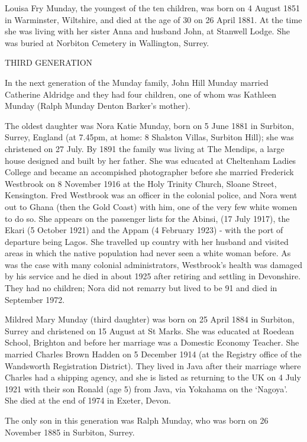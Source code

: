Louisa Fry Munday, the youngest of the ten children, was born on 4 August 1851 in Warminster, Wiltshire, and died at the age of 30 on 26 April 1881. At the time she was living with her sister Anna and husband John, at Stanwell Lodge. She was buried at Norbiton Cemetery in	Wallington, Surrey. 


THIRD GENERATION

In the next generation of the Munday family, John Hill Munday married Catherine Aldridge and they had four children, one of whom was Kathleen Munday (Ralph Munday Denton Barker's mother). 

The oldest daughter was Nora Katie Munday, born on 5 June 1881 in Surbiton, Surrey, England (at 7.45pm, at home: 8 Shalston Villas, Surbiton Hill); she was christened on 27 July. By 1891 the family was living at The Mendips, a large house designed and built by her father. She was educated at Cheltenham Ladies College and became an accompished photographer before she married Frederick Westbrook on 8 November 1916 at the	Holy Trinity Church, Sloane Street, Kensington. Fred Westbrook  was an officer in the colonial police, and Nora went out to Ghana (then the Gold Coast) with him, one of the very few white women to do so. She appears on the passenger lists for the Abinsi, (17 July 1917), the Ekari (5 October 1921) and the Appam (4 February 1923) - with the port of departure being Lagos. She travelled up country with her husband and visited areas in which the native population had never seen a white woman before. As was the case with many colonial administrators, Westbrook's health was damaged by his service and he died in about 1925 after retiring and settling in Devonshire. They had no children; Nora did not remarry but lived to be 91 and died in September 1972. 

Mildred Mary Munday (third daughter) was born on 25 April 1884 in	Surbiton, Surrey and christened on 15 August at St Marks. She was educated at Roedean School, Brighton and before her marriage was a Domestic Economy Teacher. She married Charles Brown Hadden on 5 December 1914 (at the Registry office of the Wandsworth Registration District). They lived in Java after their marriage where Charles had a shipping agency, and she is listed as returning to the UK on 4 July 1921 with their son Ronald (age 5) from Java, via Yokahama on the `Nagoya'.  She died at the end of 
1974 in	Exeter, Devon.

The only son in this generation was Ralph Munday, who was born on 26 November 1885 in Surbiton, Surrey.  

